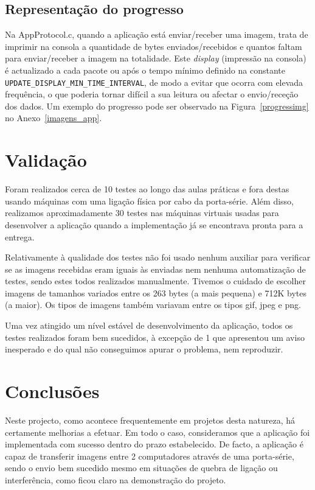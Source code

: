 \documentclass[11pt,a4paper,reqno]{report}
\numberwithin{equation}{section}
\begin{document}
\section{Representação do progresso}
Na AppProtocol.c, quando a aplicação está enviar/receber uma imagem, trata de imprimir na consola a quantidade de bytes enviados/recebidos e quantos faltam para enviar/receber a imagem na totalidade. Este \emph{display} (impressão na consola) é actualizado a cada pacote ou após o tempo mínimo definido na constante \verb|UPDATE_DISPLAY_MIN_TIME_INTERVAL|, de modo a evitar que ocorra com elevada frequência, o que poderia tornar difícil a sua leitura ou afectar o envio/receção dos dados. Um exemplo do progresso pode ser observado na Figura~\ref{progressimg} no Anexo~\ref{imagens_app}.

\chapter{Validação}

Foram realizados cerca de 10 testes ao longo das aulas práticas e fora destas usando máquinas com uma ligação física por cabo da porta-série. Além disso, realizamos aproximadamente 30 testes nas máquinas virtuais usadas para desenvolver a aplicação quando a implementação já se encontrava pronta para a entrega.

Relativamente à qualidade dos testes não foi usado nenhum auxiliar para verificar se as imagens recebidas eram iguais às enviadas nem nenhuma automatização de testes, sendo estes todos realizados manualmente. Tivemos o cuidado de escolher imagens de tamanhos variados entre os 263 bytes (a mais pequena) e 712K bytes (a maior). Os tipos de imagens também variavam entre os tipos gif, jpeg e png.

Uma vez atingido um nível estável de desenvolvimento da aplicação, todos os testes realizados foram bem sucedidos, à excepção de 1 que apresentou um aviso inesperado e do qual não conseguimos apurar o problema, nem reproduzir.

\chapter{Conclusões}

Neste projecto, como acontece frequentemente em projetos desta natureza, há certamente melhorias a efetuar. Em todo o caso, consideramos que a aplicação foi implementada com sucesso dentro do prazo estabelecido. De facto, a aplicação é capaz de transferir imagens entre 2 computadores através de uma porta-série, sendo o envio bem sucedido mesmo em situações de quebra de ligação ou interferência, como ficou claro na demonstração do projeto.
\end{document}
